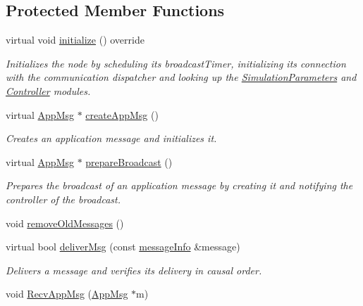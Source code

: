 \subsection*{Protected Member Functions}
\begin{DoxyCompactItemize}
\item 
virtual void \hyperlink{class_node_with_control_a08c8e80fd67b52c51c642d7c66fe729c}{initialize} () override
\begin{DoxyCompactList}\small\item\em Initializes the node by scheduling it\textquotesingle{}s broadcast\+Timer, initializing its connection with the communication dispatcher and looking up the \hyperlink{class_simulation_parameters}{Simulation\+Parameters} and \hyperlink{class_controller}{Controller} modules. \end{DoxyCompactList}\item 
virtual \hyperlink{class_app_msg}{App\+Msg} $\ast$ \hyperlink{class_node_with_control_a7772568c2836f5f204952ebe659e0049}{create\+App\+Msg} ()
\begin{DoxyCompactList}\small\item\em Creates an application message and initializes it. \end{DoxyCompactList}\item 
virtual \hyperlink{class_app_msg}{App\+Msg} $\ast$ \hyperlink{class_node_with_control_ab871014cf3f42d834f8d34ad5498174c}{prepare\+Broadcast} ()
\begin{DoxyCompactList}\small\item\em Prepares the broadcast of an application message by creating it and notifying the controller of the broadcast. \end{DoxyCompactList}\item 
void \hyperlink{class_node_with_control_add681efe156d989a717d2cd979f5ac9f}{remove\+Old\+Messages} ()
\item 
virtual bool \hyperlink{class_node_with_control_aada7451be61be592b27188b6249afef2}{deliver\+Msg} (const \hyperlink{structures_8h_a7e7bdc1d2fff8a9436f2f352b2711ed6}{message\+Info} \&message)
\begin{DoxyCompactList}\small\item\em Delivers a message and verifies its delivery in causal order. \end{DoxyCompactList}\item 
void \hyperlink{class_node_with_control_ae177f5f64edcc09a3875e5afdc82edd2}{Recv\+App\+Msg} (\hyperlink{class_app_msg}{App\+Msg} $\ast$m)
\item 

\end{DoxyCompactItemize}
